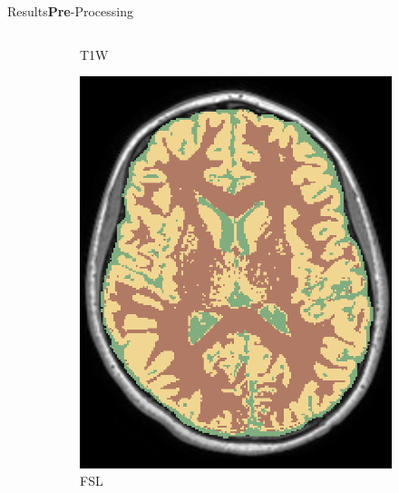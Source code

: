 \documentclass[]{standalone}
\begin{document}
\begin{frame}{Results}{\textbf{Pre}-Processing}
\begin{columns}
\begin{column}{0.65\textwidth}
\begin{figure}[h!]
\begin{subfigure}{0.3\textwidth}
					\caption*{\tiny T1W }
				\end{subfigure}
				\hfill
				\begin{subfigure}{0.3\textwidth}
					\includegraphics[scale=0.11]{./IMG/FSL_SEG48.png}
					\caption*{\tiny FSL}
				\end{subfigure}
				\hfill
				\begin{subfigure}{0.3\textwidth}

\end{subfigure}
\end{figure}
\end{column}
\end{columns}
\end{frame}
\end{document}

